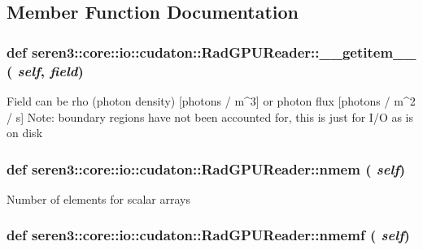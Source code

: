 \subsection{Member Function Documentation}
\hypertarget{classseren3_1_1core_1_1io_1_1cudaton_1_1RadGPUReader_a721595765b4d42b82c26068ff8576738}{
\subsubsection[{\_\-\_\-getitem\_\-\_\-}]{\setlength{\rightskip}{0pt plus 5cm}def seren3::core::io::cudaton::RadGPUReader::\_\-\_\-getitem\_\-\_\- ( {\em self}, \/   {\em field})}}
\label{classseren3_1_1core_1_1io_1_1cudaton_1_1RadGPUReader_a721595765b4d42b82c26068ff8576738}
\begin{DoxyVerb}
Field can be rho (photon density) [photons / m^3] or photon flux [photons / m^2 / s]
Note: boundary regions have not been accounted for, this is just for I/O as is on disk
\end{DoxyVerb}
 \hypertarget{classseren3_1_1core_1_1io_1_1cudaton_1_1RadGPUReader_a2f3cdcc87e09bb34f8fc6d1655229ab6}{
\subsubsection[{nmem}]{\setlength{\rightskip}{0pt plus 5cm}def seren3::core::io::cudaton::RadGPUReader::nmem ( {\em self})}}
\label{classseren3_1_1core_1_1io_1_1cudaton_1_1RadGPUReader_a2f3cdcc87e09bb34f8fc6d1655229ab6}
\begin{DoxyVerb}
Number of elements for scalar arrays
\end{DoxyVerb}
 \hypertarget{classseren3_1_1core_1_1io_1_1cudaton_1_1RadGPUReader_a6578f04222601eeb3b8367c97ee730fe}{
\subsubsection[{nmemf}]{\setlength{\rightskip}{0pt plus 5cm}def seren3::core::io::cudaton::RadGPUReader::nmemf ( {\em self})}}
